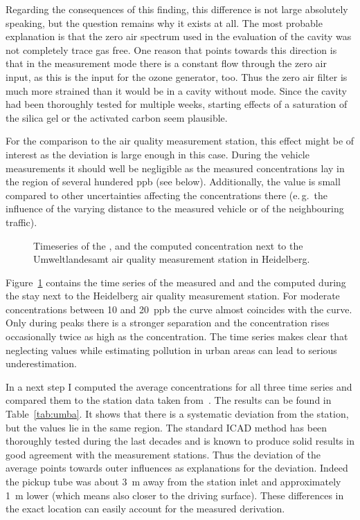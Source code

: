 Regarding the consequences of this finding, this difference is not
large absolutely speaking, but the question remains why it exists at
all. The most probable explanation is that the zero air spectrum used
in the evaluation of the  cavity was not completely trace gas
free. One reason that points towards this direction is that in the
 measurement mode there is a constant flow through the zero
air input, as this is the input for the ozone generator, too. Thus the
zero air filter is much more strained than it would be in a cavity
without  mode. Since the cavity had been thoroughly tested
for multiple weeks, starting effects of a saturation of the silica gel
or the activated carbon seem plausible.

For the comparison to the air quality measurement station, this effect
might be of interest as the deviation is large enough in this
case. During the vehicle measurements it should well be negligible as
the measured concentrations lay in the region of several hundered
\si{ppb} (see below). Additionally, the value is small compared to
other uncertainties affecting the concentrations there (e.\,g.\ the
influence of the varying distance to the measured vehicle or of the
neighbouring traffic).

\begin{figure}[htbp]
  \centering
  
  \caption{Timeseries of the ,  and the computed
     concentration next to the Umweltlandesamt air quality
    measurement station in Heidelberg.}
  \label{fig:umba}
\end{figure}

Figure~\ref{fig:umba} contains the time series of the measured
 and  and the computed  during the stay next
to the Heidelberg air quality measurement station. For moderate
 concentrations between \num{10} and \SI{20}{ppb} the
 curve almost coincides with the  curve. Only during
peaks there is a stronger separation and the  concentration
rises occasionally twice as high as the  concentration. The
time series makes clear that neglecting  values while
estimating  pollution in urban areas can lead to serious
underestimation.

In a next step I computed the average concentrations for all three
time series and compared them to the station data taken
from~\cite{umba}. The results can be found in Table~\ref{tab:umba}. It
shows that there is a systematic deviation from the station, but the
values lie in the same region. The standard ICAD method has been
thoroughly tested during the last decades and is known to produce
solid results in good agreement with the measurement stations. Thus
the deviation of the  average points towards outer influences
as explanations for the deviation. Indeed the pickup tube was about
\SI{3}{\meter} away from the station inlet and approximately
\SI{1}{\meter} lower (which means also closer to the driving
surface). These differences in the exact location can easily account
for the measured derivation.

